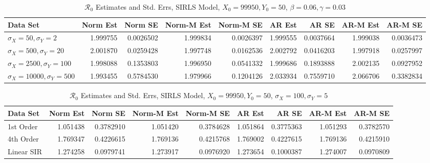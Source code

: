 \documentclass[12pt]{article}
\newcommand{\rr}{\ensuremath{\mathcal{R}_0}}
\begin{document}
\begin{table}[H]
	\caption{\label{tab:}$\rr$ Estimates and Std. Errs, SIRLS Model,
		$X_0 = 99950, Y_0 = 50$, $\beta = 0.06, \gamma = 0.03$}
	\centering
	\begin{footnotesize}
		\begin{tabular}[t]{l|r|r|r|r|r|r|r|r}
			\hline
			Data Set & Norm Est & Norm SE & Norm-M Est & Norm-M SE & AR Est & AR SE & AR-M Est & AR-M SE\\
			\hline
			$\sigma_X = 50, \sigma_Y = 2$ & 1.999755 & 0.0026502 & 1.999834 & 0.0026397 & 1.999555 & 0.0037664 & 1.999038 & 0.0036473\\
			\hline
			$\sigma_X = 500, \sigma_Y = 20$ & 2.001870 & 0.0259428 & 1.997748 & 0.0162536 & 2.002792 & 0.0416203 & 1.997918 & 0.0257997\\
			\hline
			$\sigma_X = 2500, \sigma_Y = 100$ & 1.998088 & 0.1353803 & 1.996950 & 0.0541332 & 1.999686 & 0.1893888 & 2.002135 & 0.0927952\\
			\hline
			$\sigma_X = 10000, \sigma_Y = 500$ & 1.993455 & 0.5784530 & 1.979966 & 0.1204126 & 2.033934 & 0.7559710 & 2.066706 & 0.3382834\\
			\hline
		\end{tabular}
	\end{footnotesize}
\end{table}

\begin{table}[H]
	
	\caption{\label{tab:}$\rr$ Estimates and Std. Errs, SIRLS Model,
		$X_0 = 99950, Y_0 = 50$, $\sigma_X = 100, \sigma_Y = 5$}
	\centering
	\begin{footnotesize}
		\begin{tabular}[t]{l|r|r|r|r|r|r|r|r}
			\hline
			Data Set & Norm Est & Norm SE & Norm-M Est & Norm-M SE & AR Est & AR SE & AR-M Est & AR-M SE\\
			\hline
			1st Order & 1.051438 & 0.3782910 & 1.051420 & 0.3784628 & 1.051864 & 0.3775363 & 1.051293 & 0.3782570\\
			\hline
			4th Order & 1.769347 & 0.4226615 & 1.769136 & 0.4215768 & 1.769002 & 0.4227615 & 1.769136 & 0.4215910\\
			\hline
			Linear SIR & 1.274258 & 0.0979741 & 1.273917 & 0.0976920 & 1.273654 & 0.1000387 & 1.274007 & 0.0970809\\
			\hline
		\end{tabular}
	\end{footnotesize}
\end{table}
\end{document}
